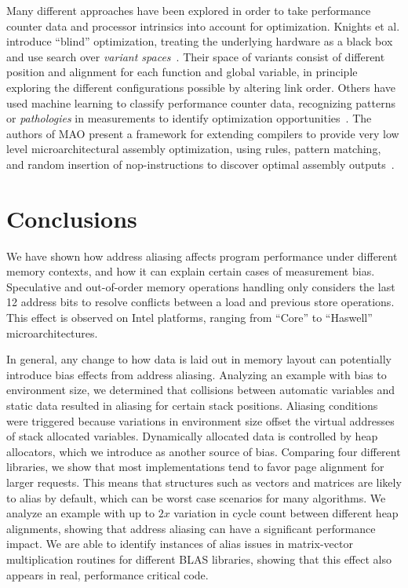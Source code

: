 \documentclass[10pt, conference, compsocconf]{IEEEtran}
\begin{document}
Many different approaches have been explored in order to take performance counter data and processor intrinsics into account for optimization.
Knights et al. introduce ``blind'' optimization, treating the underlying hardware as a black box and use search over \emph{variant spaces}~\cite{Knights:2009:BlindOpt}.
Their space of variants consist of different position and alignment for each function and global variable, in principle exploring the different configurations possible by altering link order.
Others have used machine learning to classify performance counter data, recognizing patterns or \emph{pathologies} in measurements to identify optimization opportunities~\cite{Yoo:ADD}.
The authors of MAO present a framework for extending compilers to provide very low level microarchitectural assembly optimization, using rules, pattern matching, and random insertion of nop-instructions to discover optimal assembly outputs~\cite{Hundt:2011:MAO}.

\section{Conclusions}
\label{sec:conclusions}
We have shown how address aliasing affects program performance under different memory contexts, and how it can explain certain cases of measurement bias.
Speculative and out-of-order memory operations handling only considers the last 12 address bits to resolve conflicts between a load and previous store operations.
This effect is observed on Intel platforms, ranging from ``Core'' to ``Haswell'' microarchitectures.

In general, any change to how data is laid out in memory layout can potentially introduce bias effects from address aliasing.
Analyzing an example with bias to environment size, we determined that collisions between automatic variables and static data resulted in aliasing for certain stack positions.
Aliasing conditions were triggered because variations in environment size offset the virtual addresses of stack allocated variables.
Dynamically allocated data is controlled by heap allocators, which we introduce as another source of bias.
Comparing four different libraries, we show that most implementations tend to favor page alignment for larger requests.
This means that structures such as vectors and matrices are likely to alias by default, which can be worst case scenarios for many algorithms.
We analyze an example with up to $2x$ variation in cycle count between different heap alignments, showing that address aliasing can have a significant performance impact.
We are able to identify instances of alias issues in matrix-vector multiplication routines for different BLAS libraries, showing that this effect also appears in real, performance critical code.
\end{document}
